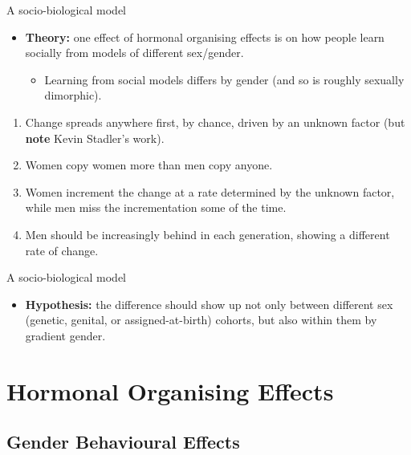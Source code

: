 \documentclass[hyperref={pdfpagelabels=false}]{beamer}
\begin{document}
\begin{frame}{A socio-biological model}
	\begin{itemize}
	\item[ ] \textbf{Theory:} one effect of hormonal organising effects is on how people learn socially from models of different sex/gender.
	\begin{itemize} \item Learning from social models differs by gender (and so is roughly sexually dimorphic). \end{itemize}
	\end{itemize}
	\begin{enumerate}
	\item Change spreads anywhere first, by chance, driven by an unknown factor (but \textbf{note} Kevin Stadler's work).
	\item Women copy women more than men copy anyone.
	\item Women increment the change at a rate determined by the unknown factor, while men miss the incrementation some of the time.
	\item Men should be increasingly behind in each generation, showing a different rate of change.
	\end{enumerate}

\end{frame}

\begin{frame}{A socio-biological model}
	\begin{itemize}
	\item \textbf{Hypothesis:} the difference should show up not only between different sex (genetic, genital, or assigned-at-birth) cohorts, but also within them by gradient gender.
	\end{itemize}
\end{frame}







\section{Hormonal Organising Effects}

\subsection{Gender Behavioural Effects}
\end{document}
